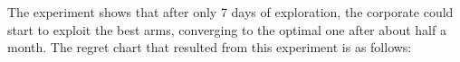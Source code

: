The experiment shows that after only 7 days of exploration, the corporate could start to exploit the best arms, converging to the optimal one after about half a month.
\newpage
The regret chart that resulted from this experiment is as follows:\\
